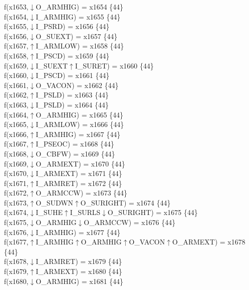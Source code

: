 f(x1653,$\downarrow$O\_ARMHIG) = x1654 \{44\} \\  
f(x1654,$\downarrow$I\_ARMHIG) = x1655 \{44\} \\  
f(x1655,$\downarrow$I\_PSRD) = x1656 \{44\} \\  
f(x1656,$\downarrow$O\_SUEXT) = x1657 \{44\} \\  
f(x1657,$\uparrow$I\_ARMLOW) = x1658 \{44\} \\  
f(x1658,$\uparrow$I\_PSCD) = x1659 \{44\} \\  
f(x1659,$\downarrow$I\_SUEXT$\uparrow$I\_SURET) = x1660 \{44\} \\  
f(x1660,$\downarrow$I\_PSCD) = x1661 \{44\} \\  
f(x1661,$\downarrow$O\_VACON) = x1662 \{44\} \\  
f(x1662,$\uparrow$I\_PSLD) = x1663 \{44\} \\  
f(x1663,$\downarrow$I\_PSLD) = x1664 \{44\} \\  
f(x1664,$\uparrow$O\_ARMHIG) = x1665 \{44\} \\  
f(x1665,$\downarrow$I\_ARMLOW) = x1666 \{44\} \\  
f(x1666,$\uparrow$I\_ARMHIG) = x1667 \{44\} \\  
f(x1667,$\uparrow$I\_PSEOC) = x1668 \{44\} \\  
f(x1668,$\downarrow$O\_CBFW) = x1669 \{44\} \\  
f(x1669,$\downarrow$O\_ARMEXT) = x1670 \{44\} \\  
f(x1670,$\downarrow$I\_ARMEXT) = x1671 \{44\} \\  
f(x1671,$\uparrow$I\_ARMRET) = x1672 \{44\} \\  
f(x1672,$\uparrow$O\_ARMCCW) = x1673 \{44\} \\  
f(x1673,$\uparrow$O\_SUDWN$\uparrow$O\_SURIGHT) = x1674 \{44\} \\  
f(x1674,$\downarrow$I\_SUHE$\uparrow$I\_SURLS$\downarrow$O\_SURIGHT) = x1675 \{44\} \\  
f(x1675,$\downarrow$O\_ARMHIG$\downarrow$O\_ARMCCW) = x1676 \{44\} \\  
f(x1676,$\downarrow$I\_ARMHIG) = x1677 \{44\} \\  
f(x1677,$\uparrow$I\_ARMHIG$\uparrow$O\_ARMHIG$\uparrow$O\_VACON$\uparrow$O\_ARMEXT) = x1678 \{44\} \\  
f(x1678,$\downarrow$I\_ARMRET) = x1679 \{44\} \\  
f(x1679,$\uparrow$I\_ARMEXT) = x1680 \{44\} \\  
f(x1680,$\downarrow$O\_ARMHIG) = x1681 \{44\} \\  
